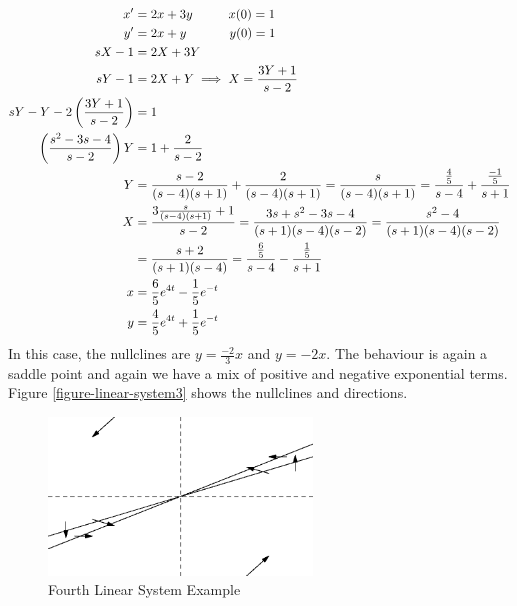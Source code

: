 \documentclass[fleqn,letterpaper]{report}
\begin{document}
\begin{example}
\begin{align*}
x^\prime & = 2x + 3y \hspace{1cm} x(0) = 1 \\
y^\prime & = 2x + y \hspace{1.2cm} y(0) = 1\\
sX - 1 & = 2X + 3Y \\
sY - 1 & = 2X + Y \implies X = \frac{3Y+1}{s-2} \\
sY - Y - 2 \left( \frac{3Y+1}{s-2} \right) & = 1 \\
\left( \frac{s^2-3s-4}{s-2} \right) Y & = 1 + \frac{2}{s-2} \\
Y & = \frac{s-2}{(s-4)(s+1)} + \frac{2}{(s-4)(s+1)} =
\frac{s}{(s-4)(s+1)} = \frac{\frac{4}{5}}{s-4} +
\frac{\frac{-1}{5}}{s+1} \\
X & = \frac{3\frac{s}{(s-4)(s+1)} + 1}{s-2} =
\frac{3s+s^2-3s-4}{(s+1)(s-4)(s-2)} =
\frac{s^2-4}{(s+1)(s-4)(s-2)} \\
& = \frac{s+2}{(s+1)(s-4)} = \frac{\frac{6}{5}}{s-4} -
\frac{\frac{1}{5}}{s+1} \\
x & = \frac{6}{5} e^{4t} - \frac{1}{5} e^{-t} \\
y & = \frac{4}{5} e^{4t} + \frac{1}{5} e^{-t}
\end{align*}
In this case, the nullclines are $y = \frac{-2}{3}x$ and $y =
-2x$. The behaviour is again a saddle point and again we have
a mix of positive and negative exponential terms. Figure
\ref{figure-linear-system3} shows the nullclines and
directions.
\end{example}

\begin{figure}[t]
\centering
\includegraphics[width=7cm]{figure37.eps}
\caption{Fourth Linear System Example}
\label{figure-linear-system4}
\end{figure}
\end{document}
